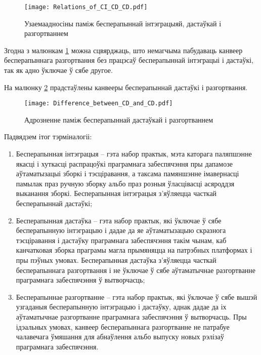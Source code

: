 \begin{figure}[h!]
    \centering
    \texttt{[image: Relations\_of\_CI\_CD\_CD.pdf]}
    \caption{Узаемаадносіны паміж бесперапыннай
             інтэграцыяй, дастаўкай і разгортваннем}
    \label{figure:relations of CI, CD, CD}
\end{figure}

Згодна з малюнкам \ref{figure:relations of CI, CD, CD}
можна сцвярджаць, што немагчыма пабудаваць канвеер бесперапыннага
разгортвання без працэсаў бесперапыннай інтэграцыі і дастаўкі,
так як адно ўключае ў сябе другое.

На малюнку \ref{figure:Difference_between_CD_and_CD}
прадстаўлены канвееры бесперапыннай дастаўкі і разгортвання.

\begin{figure}[h!]
    \centering
    \texttt{[image: Difference\_between\_CD\_and\_CD.pdf]}
    \caption{Адрозненне паміж бесперапыннай дастаўкай і разгортваннем}
    \label{figure:Difference_between_CD_and_CD}
\end{figure}

Падвядзем ітог тэрміналогіі:
\begin{enumerate}
    \item Бесперапынная інтэграцыя -- гэта набор практык,
          мэта каторага паляпшэнне якасці і хуткасці распрацоўкі
          праграмнага забеспячэння пры дапамозе аўтаматызацыі
          зборкі і тэсціравання, а таксама памяншэнне імавернасці
          памылак праз ручную зборку альбо праз розныя
          ўласцівасці асяроддзя выканання зборкі.
          Бесперапынная інтэграцыя з'яўляецца часткай бесперапыннай
          дастаўкі;
    \item Бесперапынная дастаўка -- гэта набор практык,
          які ўключае ў сябе бесперапынную інтэграцыю і дадае 
          да яе аўтаматызацыю скразнога тэсціравання і дастаўку
          праграмнага забеспячэння такім чынам, каб канчатковая
          зборка праграмы магла прымяняцца на патрэбных платформах
          і пры пэўных умовах.
          Бесперапынная дастаўка з'яўляецца часткай бесперапыннага
          разгортвання і не ўключае ў сябе аўтаматычнае
          разгортванне праграмнага забеспячэння ў вытворчасць;
    \item Бесперапыннае разгортванне -- гэта набор практык, які
          ўключае ў сябе вышэй узгаданыя бесперапынную інтэграцыю
          і дастаўку, аднак дадае да іх аўтаматычнае разгортванне
          праграмнага забеспячэння ў вытворчасць.
          Пры ідэальных умовах, канвеер бесперапыннага разгортванне
          не патрабуе чалавечага ўмяшання для абнаўлення альбо выпуску
          новых рэлізаў праг\-рам\-на\-га забеспячэння.
\end{enumerate}
